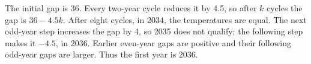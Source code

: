 The initial gap is 36. Every two-year cycle reduces it by 4.5, so after $ k $ cycles the gap is $ 36-4.5k $. After eight cycles, in 2034, the temperatures are equal. The next odd-year step increases the gap by 4, so 2035 does not qualify; the following step makes it $-4.5 $, in 2036. Earlier even-year gaps are positive and their following odd-year gaps are larger. Thus the first year is $\boxed{2036}$.
